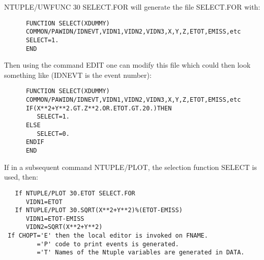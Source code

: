 NTUPLE/UWFUNC 30 SELECT.FOR   will generate the file SELECT.FOR with:
\begin{verbatim}
      FUNCTION SELECT(XDUMMY)
      COMMON/PAWIDN/IDNEVT,VIDN1,VIDN2,VIDN3,X,Y,Z,ETOT,EMISS,etc
      SELECT=1.
      END
\end{verbatim}
Then using the command EDIT one can modify this file which could then
look something like (IDNEVT is the event number):
\begin{verbatim}
      FUNCTION SELECT(XDUMMY)
      COMMON/PAWIDN/IDNEVT,VIDN1,VIDN2,VIDN3,X,Y,Z,ETOT,EMISS,etc
      IF(X**2+Y**2.GT.Z**2.OR.ETOT.GT.20.)THEN
         SELECT=1.
      ELSE
         SELECT=0.
      ENDIF
      END
\end{verbatim}
If in a subsequent command NTUPLE/PLOT, the selection function SELECT
is used, then:
\begin{verbatim}
   If NTUPLE/PLOT 30.ETOT SELECT.FOR
      VIDN1=ETOT
   If NTUPLE/PLOT 30.SQRT(X**2+Y**2)%(ETOT-EMISS)
      VIDN1=ETOT-EMISS
      VIDN2=SQRT(X**2+Y**2)
 If CHOPT='E' then the local editor is invoked on FNAME.
         ='P' code to print events is generated.
         ='T' Names of the Ntuple variables are generated in DATA.
\end{verbatim}
\ENDTEXT

